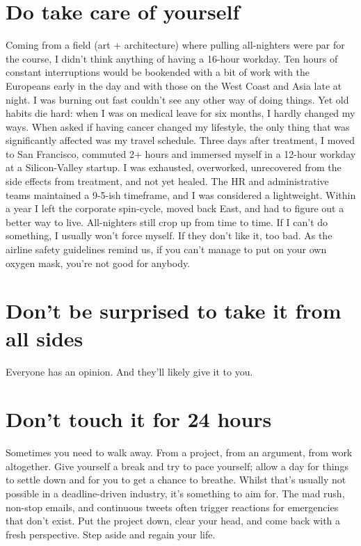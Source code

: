 \section*{Do take care of yourself}
Coming from a field (art + architecture) where pulling all-nighters were par for
the course, I didn't think anything of having a 16-hour workday. Ten hours of
constant interruptions would be bookended with a bit of work with the Europeans
early in the day and with those on the West Coast and Asia late at night. I was
burning out fast couldn't see any other way of doing things. Yet old habits die
hard: when I was on medical leave for six months, I hardly changed my ways. When
asked if having cancer changed my lifestyle, the only thing that was
significantly affected was my travel schedule. Three days after treatment, I
moved to San Francisco, commuted 2+ hours and immersed myself in a 12-hour
workday at a Silicon-Valley startup. I was exhausted, overworked, unrecovered
from the side effects from treatment, and not yet healed. The HR and
administrative teams maintained a 9-5-ish timeframe, and I was considered a
lightweight. Within a year I left the corporate spin-cycle, moved back East, and
had to figure out a better way to live. All-nighters still crop up from time to
time. If I can't do something, I usually won't force myself. If they don't like
it, too bad. As the airline safety guidelines remind us, if you can't manage to
put on your own oxygen mask, you're not good for anybody.

\section*{Don't be surprised to take it from all sides}
Everyone has an opinion. And they'll likely give it to you.

\section*{Don't touch it for 24 hours}
Sometimes you need to walk away. From a project, from an argument, from work
altogether. Give yourself a break and try to pace yourself; allow a day for
things to settle down and for you to get a chance to breathe. Whilst that's
usually not possible in a deadline-driven industry, it's something to aim for.
The mad rush, non-stop emails, and continuous tweets often trigger reactions for
emergencies that don't exist. Put the project down, clear your head, and come
back with a fresh perspective. Step aside and regain your life.

